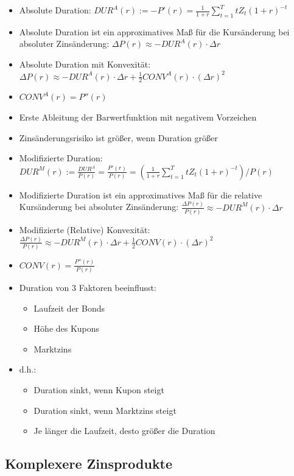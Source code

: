 \documentclass[12pt]{report}
\theoremstyle{dotless}
\theoremstyle{definition}
\begin{document}
\begin{itemize}
	\item Absolute Duration: $DUR^A(r):= -P'(r) = \frac{1}{1+r} \sum_{t=1}^T t Z_t(1+r)^{-t}$
	\item Absolute Duration ist ein approximatives Ma{\ss} f\"ur die Kurs\"anderung bei absoluter Zins\"anderung: $\Delta P(r) \approx -DUR^A(r) \cdot \Delta r$
	\item Absolute Duration mit Konvexit\"at: $\Delta P(r) \approx -DUR^A(r) \cdot \Delta r + \frac{1}{2} CONV^A(r) \cdot (\Delta r)^2$
	\item $CONV^A(r) = P''(r)$
	\item Erste Ableitung der Barwertfunktion mit negativem Vorzeichen
	\item Zins\"anderungsrisiko ist gr\"o{\ss}er, wenn Duration gr\"o{\ss}er
	\item Modifizierte Duration: $DUR^M(r) := \frac{DUR^A}{P(r)} = \frac{P'(r)}{P(r)} = (\frac{1}{1+r}  \sum_{t=1}^T tZ_t(1+r)^{-t}) / P(r)$
	\item Modifizierte Duration ist ein approximatives Ma{\ss} f\"ur die relative Kurs\"anderung bei absoluter Zins\"anderung: $\frac{\Delta P(r)}{P(r)} \approx -DUR^M(r) \cdot \Delta r$
	\item Modifizierte (Relative) Konvexit\"at: $\frac{\Delta P(r)}{P(r)} \approx -DUR^M(r) \cdot \Delta r + \frac{1}{2} CONV(r) \cdot (\Delta r)^2$
	\item $CONV(r) = \frac{P''(r)}{P(r)}$
	\item Duration von 3 Faktoren beeinflusst:
	\begin{itemize}
		\item Laufzeit der Bonds
		\item H\"ohe des Kupons
		\item Marktzins
	\end{itemize}
	\item d.h.:
	\begin{itemize}
		\item Duration sinkt, wenn Kupon steigt
		\item Duration sinkt, wenn Marktzins steigt
		\item Je l\"anger die Laufzeit, desto gr\"o{\ss}er die Duration
	\end{itemize}
\end{itemize}

\subsection{Komplexere Zinsprodukte}
\end{document}
